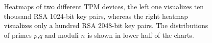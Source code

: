 \begin{figure}[H]
  \centering
  \hfill
  \caption{Heatmaps of two different TPM devices, the left one visualizes ten thousand RSA 1024-bit key pairs, whereas the right heatmap visualizes only a hundred RSA 2048-bit key pairs. The distributions of primes $p$,$q$ and moduli $n$ is shown in lower half of the charts.}
\end{figure}



